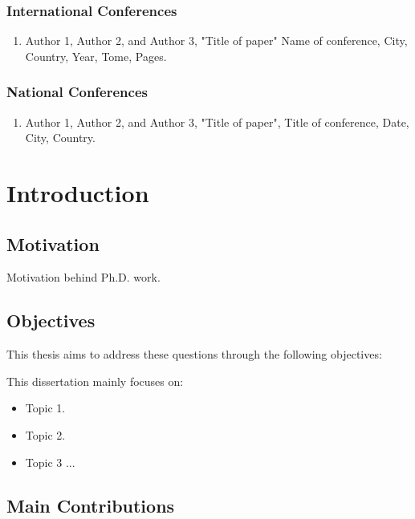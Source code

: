 \documentclass[a4paper, twoside, 12pt]{report}
\begin{document}
	\subsection*{International Conferences}
	
	\begin{enumerate}
		\item Author 1, Author 2, and Author 3, "Title of paper" Name of conference, City, Country, Year, Tome, Pages.
	\end{enumerate}
	
	\subsection*{National Conferences}
	
	\begin{enumerate}
		\item Author 1, Author 2, and Author 3, "Title of paper", Title of conference, Date, City, Country.
	\end{enumerate}
	
	\chapter*{Introduction}
	
	
	\section*{Motivation}
	
	Motivation behind Ph.D. work.
	
	\section*{Objectives}
	
	This thesis aims to address these questions through the following objectives:
	
	This dissertation mainly focuses on:
	\begin{itemize}
		\item Topic 1.
		\item Topic 2.
		\item Topic 3 ...
	\end{itemize}
	
	\section*{Main Contributions}
	
\end{document}
